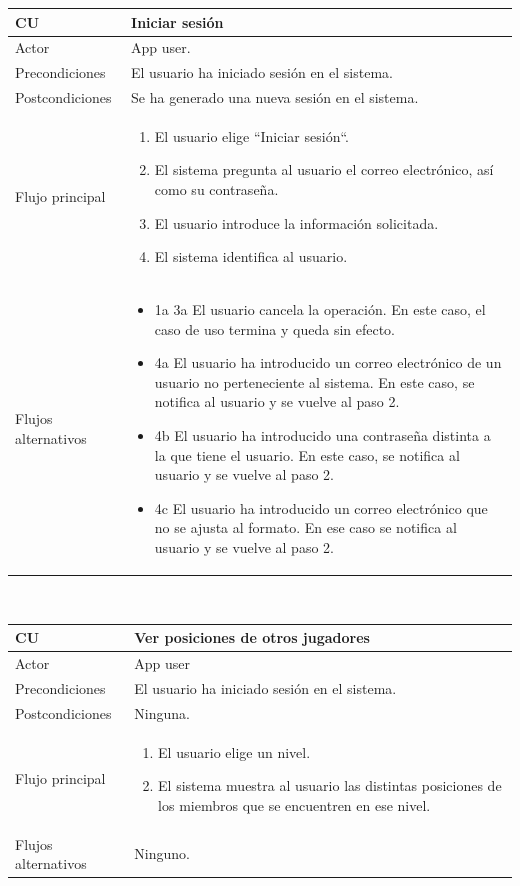\documentclass[twoside]{report}
\newcommand\addrow[2]{#1 &#2\\ }
\newcommand\addheading[2]{#1 &#2\\ \hline}
\newcommand\tabularhead{\begin{tabular}{lp{0.7\textwidth}}
\hline
}
\newenvironment{usecase}{\tabularhead}
{\hline\end{tabular}}
\begin{document}
\begin{usecase}
  \addheading{\textbf{CU\arabic{usecase}}}{Iniciar sesión} 
  \addrow{Actor}{App user.}
  \addrow{Precondiciones}{El usuario ha iniciado sesión en el sistema.}
  \addrow{Postcondiciones}{Se ha generado una nueva sesión en el sistema.}
  \addrow{Flujo principal}{
  		\begin{enumerate}
  		\item El usuario elige “Iniciar sesión“. %
  		\item El sistema pregunta al usuario el correo electrónico, así como su contraseña. %
  		\item El usuario introduce la información solicitada. %
  		\item El sistema identifica al usuario. %
  		\end{enumerate}
  }
  \addrow{Flujos alternativos}{
  		\begin{itemize}
  		\item 1a 3a El usuario cancela la operación. En este caso, el caso de uso termina y queda sin efecto.
  		\item 4a El usuario ha introducido un correo electrónico de un usuario no perteneciente al sistema. En este caso, se notifica al usuario y se vuelve al paso 2.
  		\item 4b El usuario ha introducido una contraseña distinta a la que tiene el usuario. En este caso, se notifica al usuario y se vuelve al paso 2.
  		\item 4c El usuario ha introducido un correo electrónico que no se ajusta al formato. En ese caso se notifica al usuario y se vuelve al paso 2.
  		\end{itemize}
  }
\end{usecase}\\

\vspace{0.5cm}

\begin{usecase}
  \addheading{\textbf{CU\arabic{usecase}}}{Ver posiciones de otros jugadores} 
  \addrow{Actor}{App user}
  \addrow{Precondiciones}{El usuario ha iniciado sesión en el sistema.}
  \addrow{Postcondiciones}{Ninguna.}
  \addrow{Flujo principal}{
  		\begin{enumerate}
  		\item El usuario elige un nivel.
  		\item El sistema muestra al usuario las distintas posiciones de los miembros que se encuentren en ese nivel.
  		\end{enumerate}
  }
  \addrow{Flujos alternativos}{Ninguno.}
\end{usecase}\\
\end{document}
